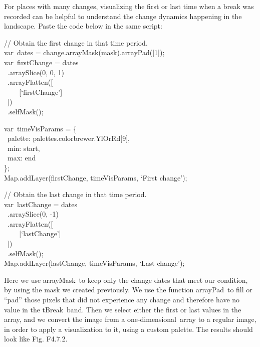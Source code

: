 \documentclass[
  letterpaper,
  DIV=11,
  numbers=noendperiod]{scrreprt}
\begin{document}
For places with many changes, visualizing the first or last time when a
break was recorded can be helpful to understand the change dynamics
happening in the landscape. Paste the code below in the same script:

// Obtain the first change in that time period.\\
var~dates = change.arrayMask(mask).arrayPad({[}1{]});\\
var~firstChange = dates\\
\hspace*{0.333em} ~.arraySlice(0, 0, 1)\\
\hspace*{0.333em} ~.arrayFlatten({[}\\
\hspace*{0.333em} ~ ~ ~{[}`firstChange'{]}\\
\hspace*{0.333em} ~{]})\\
\hspace*{0.333em} ~.selfMask();

var~timeVisParams = \{\\
\hspace*{0.333em} ~palette: palettes.colorbrewer.YlOrRd{[}9{]},\\
\hspace*{0.333em} ~min: start,\\
\hspace*{0.333em} ~max: end\\
\};\\
Map.addLayer(firstChange, timeVisParams, `First change');

// Obtain the last change in that time period.\\
var~lastChange = dates\\
\hspace*{0.333em} ~.arraySlice(0, -1)\\
\hspace*{0.333em} ~.arrayFlatten({[}\\
\hspace*{0.333em} ~ ~ ~{[}`lastChange'{]}\\
\hspace*{0.333em} ~{]})\\
\hspace*{0.333em} ~.selfMask();\\
Map.addLayer(lastChange, timeVisParams, `Last change');

Here we use arrayMask~to keep only the change dates that meet our
condition, by using the mask we created previously. We use the function
arrayPad~to fill or ``pad'' those pixels that did not experience any
change and therefore have no value in the tBreak~band. Then we select
either the first or last values in the array, and we convert the image
from a one-dimensional~array to a regular image, in order to apply a
visualization to it, using a custom palette. The results should look
like Fig. F4.7.2.
\end{document}
